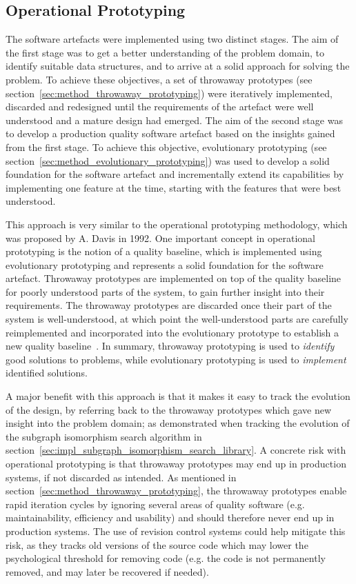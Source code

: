 
\subsection{Operational Prototyping}

The software artefacts were implemented using two distinct stages. The aim of the first stage was to get a better understanding of the problem domain, to identify suitable data structures, and to arrive at a solid approach for solving the problem. To achieve these objectives, a set of throwaway prototypes (see section~\ref{sec:method_throwaway_prototyping}) were iteratively implemented, discarded and redesigned until the requirements of the artefact were well understood and a mature design had emerged. The aim of the second stage was to develop a production quality software artefact based on the insights gained from the first stage. To achieve this objective, evolutionary prototyping (see section~\ref{sec:method_evolutionary_prototyping}) was used to develop a solid foundation for the software artefact and incrementally extend its capabilities by implementing one feature at the time, starting with the features that were best understood.

This approach is very similar to the operational prototyping methodology, which was proposed by A. Davis in 1992. One important concept in operational prototyping is the notion of a quality baseline, which is implemented using evolutionary prototyping and represents a solid foundation for the software artefact. Throwaway prototypes are implemented on top of the quality baseline for poorly understood parts of the system, to gain further insight into their requirements. The throwaway prototypes are discarded once their part of the system is well-understood, at which point the well-understood parts are carefully reimplemented and incorporated into the evolutionary prototype to establish a new quality baseline~\cite{operational_prototyping}. In summary, throwaway prototyping is used to \textit{identify} good solutions to problems, while evolutionary prototyping is used to \textit{implement} identified solutions.

A major benefit with this approach is that it makes it easy to track the evolution of the design, by referring back to the throwaway prototypes which gave new insight into the problem domain; as demonstrated when tracking the evolution of the subgraph isomorphism search algorithm in section~\ref{sec:impl_subgraph_isomorphism_search_library}. A concrete risk with operational prototyping is that throwaway prototypes may end up in production systems, if not discarded as intended. As mentioned in section~\ref{sec:method_throwaway_prototyping}, the throwaway prototypes enable rapid iteration cycles by ignoring several areas of quality software (e.g. maintainability, efficiency and usability) and should therefore never end up in production systems. The use of revision control systems could help mitigate this risk, as they tracks old versions of the source code which may lower the psychological threshold for removing code (e.g. the code is not permanently removed, and may later be recovered if needed).





